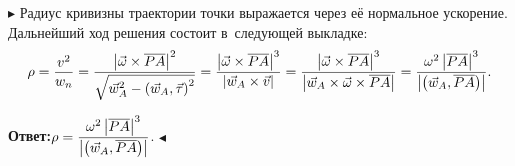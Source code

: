 \documentclass{weekly}
\begin{document}
$\blacktriangleright$ Радиус кривизны траектории точки выражается
через её нормальное ускорение. Дальнейший ход решения
состоит в~следующей выкладке:
\begin{equation}
    \rho = \frac{v^2}{w_n}
        = \frac{\left| \vec\omega \times \overline{PA} \right|^2}
            {\sqrt{\vec w_A^2 - \left(\vec w_A, \vec\tau\right)^2}}
        = \frac{\left| \vec\omega \times \overline{PA} \right|^3}
            {\left| \vec w_A \times \vec v \right|}
        = \frac{\left| \vec\omega \times \overline{PA} \right|^3}
            {\left| \vec w_A \times \vec\omega \times \overline{PA} \right|}
        = \frac{\omega^2 \left| \overline{PA} \right|^3}
            {\left| \left(\vec w_A, \overline{PA}\right) \right|}.
\end{equation}

\textbf{Ответ:}\quad $\rho = \dfrac{\omega^2 \left| \overline{PA} \right|^3}
{\left| \left(\vec w_A, \overline{PA}\right) \right|}$.
\hfill $\blacktriangleleft$
\end{document}
